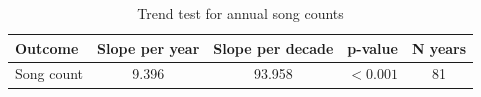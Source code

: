 \begin{table}[H]
\centering
\caption{Trend test for annual song counts}
\label{tab:count_trend}
\begin{tabular}{lcccc}
\toprule
Outcome & Slope per year & Slope per decade & p-value & N years \\
\midrule
Song count & 9.396 & 93.958 & $<0.001$ & 81 \\
\bottomrule
\end{tabular}
\end{table}
